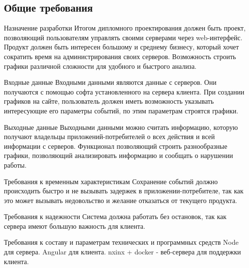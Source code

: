 \subsection{Общие требования}

Назначение разработки
Итогом дипломного проектирования должен быть проект, позволяющий пользователям управлять своими серверами через web-интерфейс. 
Продукт должен быть интересен большому и среднему бизнесу, который хочет сократить время на администрирования своих серверов.
Возможность строить графики различной сложности для удобного и быстрого анализа.
 
Входные данные
Входными данными являются данные с серверов. Они получаются с помощью софта установленного на сервера клиента.
При создании графиков на сайте, пользователь должен иметь возможность указывать интересующие его параметры событий, по этим параметрам строятся графики.
 
Выходные данные
Выходными данными можно считать информацию, которую получают владельцы приложений-потребителей о всех действия и всей информации с серверов. Функционал позволяющий строить разнообразные графики, позволяющий анализировать информацию и сообщать о нарушении работы. 
 
Требования к временным характеристикам
Сохранение событий должно происходить быстро и не вызывать задержек в приложении-потребителе, так как это может вызывать недовольство и желание отказаться от текущего продукта.
 
Требования к надежности
Система должна работать без остановок, так как сервера имеют большую важность для клиента.
 
Требования к составу и параметрам технических и программных средств
Node для сервера.
Angular для клиента.
nxinx + docker - веб-сервера для поддержки клиента.

